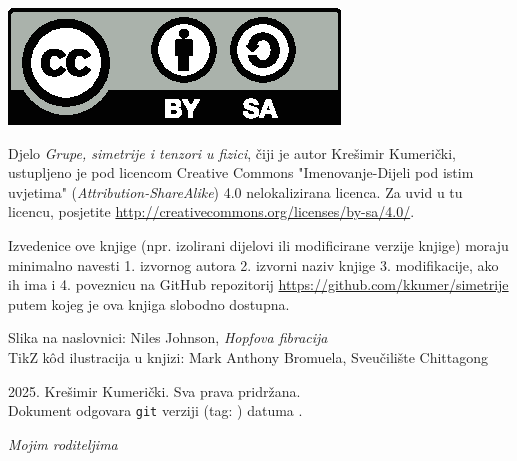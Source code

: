 
\thispagestyle{empty}

\vspace*{5em}


\centerline{\includegraphics[scale=1.0,clip]{figures/by-sa.eps}}
Djelo \emph{Grupe, simetrije i tenzori u fizici}, čiji je autor Krešimir
Kumerički, ustupljeno je pod licencom Creative Commons 
"Imenovanje-Dijeli pod istim uvjetima" (\emph{Attribution-ShareAlike}) 
4.0 nelokalizirana licenca. Za uvid u tu licencu, posjetite
\url{http://creativecommons.org/licenses/by-sa/4.0/}.

Izvedenice ove knjige (npr. izolirani dijelovi ili modificirane verzije knjige) moraju minimalno
navesti 1. izvornog autora 2. izvorni naziv knjige 3. modifikacije, ako ih ima i
4. poveznicu na GitHub repozitorij
\url{https://github.com/kkumer/simetrije} putem kojeg je ova knjiga
slobodno dostupna.

\vspace*{3em}
Slika na naslovnici: Niles Johnson, \emph{Hopfova fibracija}\\
TikZ k\^{o}d ilustracija u knjizi: Mark Anthony Bromuela, Sveučilište Chittagong

\vspace*{3em}
\textcopyright{} 2025. Krešimir Kumerički. Sva prava pridržana.\\
\small
Dokument odgovara \texttt{git} verziji \texttt{\githash} (tag: \texttt{\gittag}) datuma \gitdate.

\cleardoublepage
\thispagestyle{empty}
\vspace*{10em}
\begin{flushright}
    \emph{Mojim roditeljima}
\end{flushright}
\cleardoublepage
